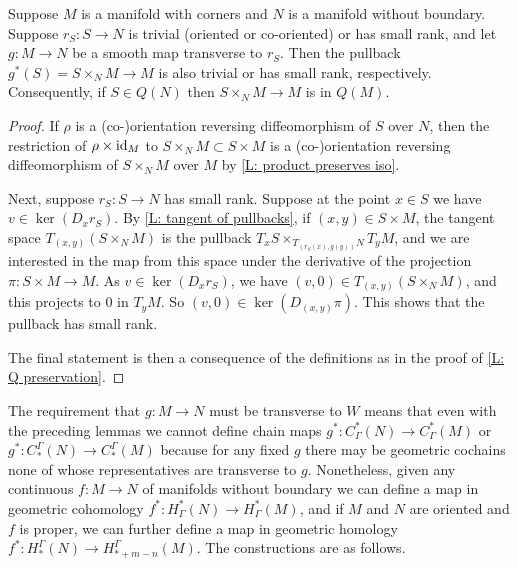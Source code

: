 \begin{lemma}\label{L: pullback map Q}
	Suppose $M$ is a manifold with corners and $N$ is a manifold without boundary.
	Suppose $r_S \colon S \to N$ is trivial (oriented or co-oriented) or has small rank, and let $g \colon M \to N$ be a smooth map transverse to $r_S$.
	Then the pullback $g^*(S) = S \times_N M \to M$ is also trivial or has small rank, respectively.
	Consequently, if $S \in Q(N)$ then $S \times_N M \to M$ is in $Q(M)$.
\end{lemma}

\begin{proof}
	If $\rho$ is a (co\nobreakdash-)orientation reversing diffeomorphism of $S$ over $N$, then the restriction of $\rho \times \mathrm{id}_M$ to $S \times_N M \subset S \times M$ is a (co\nobreakdash-)orientation reversing diffeomorphism of $S \times_N M$ over $M$ by \cref{L: product preserves iso}.

	Next, suppose $r_S \colon S \to N$ has small rank.
	Suppose at the point $x \in S$ we have $v \in \ker(D_x r_S)$.
	By \cref{L: tangent of pullbacks}, if $(x,y) \in S \times M$, the tangent space $T_{(x,y)}(S \times_N M)$ is the pullback $T_xS\times_{T_{(r_S(x),g(y))}N} T_y M$, and we are interested in the map from this space under the derivative of the projection $\pi \colon S \times M \to M$.
	As $v \in \ker (D_xr_S)$, we have $(v,0) \in T_{(x,y)}(S \times_N M)$, and this projects to $0$ in $T_yM$.
	So $(v,0) \in \ker(D_{(x,y)}\pi)$.
	This shows that the pullback has small rank.

	The final statement is then a consequence of the definitions as in the proof of \cref{L: Q preservation}.
\end{proof}

The requirement that $g \colon M \to N$ must be transverse to $W$ means that even with the preceding lemmas we cannot define chain maps $g^* \colon C^*_\Gamma(N) \to C^*_\Gamma(M)$ or $g^* \colon C_*^\Gamma(N) \to C_*^\Gamma(M)$ because for any fixed $g$ there may be geometric cochains none of whose representatives are transverse to $g$.
Nonetheless, given any continuous $f \colon M \to N$ of manifolds without boundary we can define a map in geometric cohomology $f^* \colon H^*_\Gamma(N) \to H^*_\Gamma(M)$, and if $M$ and $N$ are oriented and $f$ is proper, we can further define a map in geometric homology $f^* \colon H_*^\Gamma(N) \to H_{*+m-n}^\Gamma(M)$.
The constructions are as follows.

